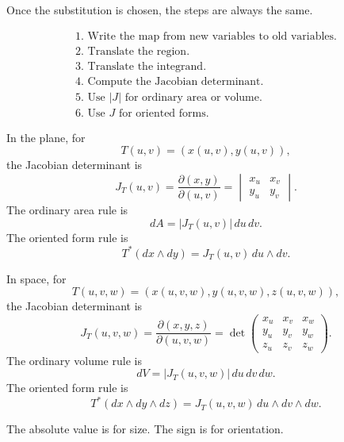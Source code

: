 Once the substitution is chosen, the steps are always the same.

\[
\boxed{
\begin{array}{l}
\text{1. Write the map from new variables to old variables.}\\
\text{2. Translate the region.}\\
\text{3. Translate the integrand.}\\
\text{4. Compute the Jacobian determinant.}\\
\text{5. Use } |J| \text{ for ordinary area or volume.}\\
\text{6. Use } J \text{ for oriented forms.}
\end{array}
}
\]

In the plane, for
\[
    T(u,v)=(x(u,v),y(u,v)),
\]
the Jacobian determinant is
\[
\boxed{
    J_T(u,v)=
    \frac{\partial(x,y)}{\partial(u,v)}
    =
    \begin{vmatrix}
    x_u&x_v\\
    y_u&y_v
    \end{vmatrix}.
}
\]
The ordinary area rule is
\[
\boxed{
    dA=|J_T(u,v)|\,du\,dv.
}
\]
The oriented form rule is
\[
\boxed{
    T^*(dx\wedge dy)
    =
    J_T(u,v)\,du\wedge dv.
}
\]

In space, for
\[
    T(u,v,w)=(x(u,v,w),y(u,v,w),z(u,v,w)),
\]
the Jacobian determinant is
\[
\boxed{
    J_T(u,v,w)=
    \frac{\partial(x,y,z)}{\partial(u,v,w)}
    =
    \det
    \begin{pmatrix}
    x_u&x_v&x_w\\
    y_u&y_v&y_w\\
    z_u&z_v&z_w
    \end{pmatrix}.
}
\]
The ordinary volume rule is
\[
\boxed{
    dV=|J_T(u,v,w)|\,du\,dv\,dw.
}
\]
The oriented form rule is
\[
\boxed{
    T^*(dx\wedge dy\wedge dz)
    =
    J_T(u,v,w)\,du\wedge dv\wedge dw.
}
\]

The absolute value is for size.  The sign is for orientation.

